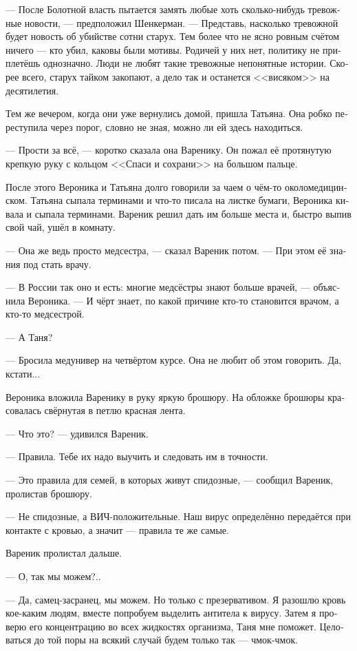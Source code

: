 \documentclass[a5paper,12pt,fleqn]{extbook}\usepackage{cooltooltips}\usepackage{polyglossia}\setdefaultlanguage[babelshorthands=true]{russian}\setotherlanguage{english}\defaultfontfeatures{Ligatures=TeX,Mapping=tex-text} \usepackage{xcolor}\definecolor{lightgray}{HTML}{bbbbbb}\color{lightgray}\newcommand{\ml}[3]{\textenglish{\textcolor{black}{#3}}}
\begin{document}
--- После Болотной власть пытается замять любые хоть сколько-нибудь тревожные новости, --- предположил Шенкерман.
--- Представь, насколько тревожной будет новость об убийстве сотни старух.
Тем более что не ясно ровным счётом ничего --- кто убил, каковы были мотивы.
Родичей у них нет, политику не приплетёшь однозначно.
Люди не любят такие тревожные непонятные истории.
Скорее всего, старух тайком закопают, а дело так и останется <<висяком>> на десятилетия.

Тем же вечером, когда они уже вернулись домой, пришла Татьяна.
Она робко переступила через порог, словно не зная, можно ли ей здесь находиться.

--- Прости за всё, --- коротко сказала она Варенику.
Он пожал её протянутую крепкую руку с кольцом <<Спаси и сохрани>> на большом пальце.

После этого Вероника и Татьяна долго говорили за чаем о чём-то околомедицинском.
Татьяна сыпала терминами и что-то писала на листке бумаги, Вероника кивала и сыпала терминами.
Вареник решил дать им больше места и, быстро выпив свой чай, ушёл в комнату.

--- Она же ведь просто медсестра, --- сказал Вареник потом.
--- При этом её знания под стать врачу.

--- В России так оно и есть: многие медсёстры знают больше врачей, --- объяснила Вероника.
--- И чёрт знает, по какой причине кто-то становится врачом, а кто-то медсестрой.

--- А Таня?

--- Бросила медунивер на четвёртом курсе.
Она не любит об этом говорить.
Да, кстати...

Вероника вложила Варенику в руку яркую брошюру.
На обложке брошюры красовалась свёрнутая в петлю красная лента.

--- Что это? --- удивился Вареник.

--- Правила.
Тебе их надо выучить и следовать им в точности.

--- Это правила для семей, в которых живут спидозные, --- сообщил Вареник, пролистав брошюру.

--- Не спидозные, а ВИЧ-положительные.
Наш вирус определённо передаётся при контакте с кровью, а значит --- правила те же самые.

Вареник пролистал дальше.

--- О, так мы можем?..

--- Да, самец-засранец, мы можем.
Но только с презервативом.
Я разошлю кровь кое-каким людям, вместе попробуем выделить антитела к вирусу.
Затем я проверю его концентрацию во всех жидкостях организма, Таня мне поможет.
Целоваться до той поры на всякий случай будем только так --- чмок-чмок.
\end{document}
